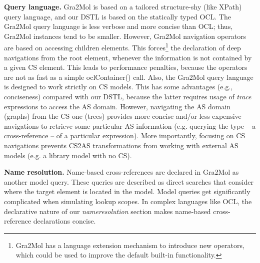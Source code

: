\documentclass{llncs}
\begin{document}
\textbf{Query language.} Gra2Mol is based on a tailored structure-shy (like XPath) query language, and our DSTL is based on the statically typed OCL. %
The Gra2Mol query language is less verbose and more concise than OCL; thus,  Gra2Mol instances tend to be smaller. However, Gra2Mol navigation operators are based on accessing children elements. This forces\footnote{Gra2Mol has a language extension mechanism to introduce new operators, which could be used to improve the default built-in functionality.} the declaration of deep navigations from the root element, whenever the information is not contained by a given CS element. This leads to performance penalties, because the operators are not as fast as a simple oclContainer() call. Also, the Gra2Mol query language is designed to work strictly on CS models. This has some advantages (e.g., conciseness) compared with our DSTL, because the latter requires usage of \textit{trace} expressions to access the AS domain. However, navigating the AS domain (graphs) from the CS one (trees) provides more concise and/or less expensive navigations to retrieve some particular AS information (e.g. querying the type -- a cross-reference -- of a particular expression). More importantly, focusing on CS navigations prevents CS2AS transformations from working with external AS models (e.g. a library model with no CS).


\textbf{Name resolution.} Name-based cross-references are declared in Gra2Mol as another model query. These queries are described as direct searches that consider where the target element is located in the model. Model queries get significantly complicated when simulating lookup scopes. In complex languages like OCL, the declarative nature of our \textit{nameresolution} section makes name-based cross-reference declarations concise.

\end{document}
